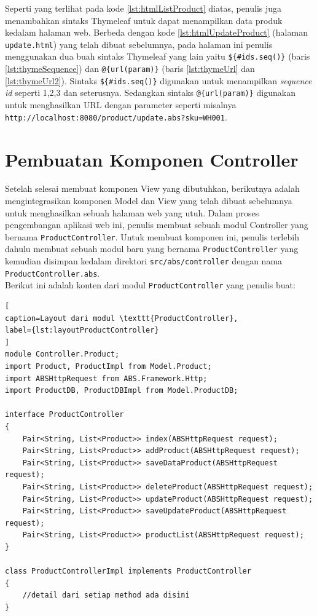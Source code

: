Seperti yang terlihat pada kode \ref{lst:htmlListProduct} diatas, penulis juga menambahkan sintaks Thymeleaf untuk dapat menampilkan data produk kedalam halaman web. Berbeda dengan kode \ref{lst:htmlUpdateProduct} (halaman \texttt{update.html}) yang telah dibuat sebelumnya, pada halaman ini penulis menggunakan dua buah sintaks Thymeleaf yang lain yaitu \texttt{\$\{\#ids.seq()\}} (baris \ref{lst:thymeSequence}) dan \texttt{@\{url(param)\}} (baris \ref{lst:thymeUrl} dan \ref{lst:thymeUrl2}). Sintaks \texttt{\$\{\#ids.seq()\}} digunakan untuk menampilkan \textit{sequence id} seperti 1,2,3 dan seterusnya. Sedangkan sintaks \texttt{@\{url(param)\}} digunakan untuk menghasilkan URL dengan parameter seperti misalnya \texttt{http://localhost:8080/product/update.abs?sku=WH001}.

\section{Pembuatan Komponen Controller}

Setelah selesai membuat komponen View yang dibutuhkan, berikutnya adalah mengintegrasikan komponen Model dan View yang telah dibuat sebelumnya untuk menghasilkan sebuah halaman web yang utuh. Dalam proses pengembangan aplikasi web ini, penulis membuat sebuah modul Controller yang bernama \texttt{ProductController}. Untuk membuat komponen ini, penulis terlebih dahulu membuat sebuah modul baru yang bernama \texttt{ProductController} yang kemudian disimpan kedalam direktori \texttt{src/abs/controller} dengan nama \texttt{ProductController.abs}.\\

Berikut ini adalah konten dari modul \texttt{ProductController} yang penulis buat:

\begin{lstlisting}[
caption=Layout dari modul \texttt{ProductController},
label={lst:layoutProductController}
]
module Controller.Product;
import Product, ProductImpl from Model.Product;
import ABSHttpRequest from ABS.Framework.Http;
import ProductDB, ProductDBImpl from Model.ProductDB;

interface ProductController
{
	Pair<String, List<Product>> index(ABSHttpRequest request);
	Pair<String, List<Product>> addProduct(ABSHttpRequest request);
	Pair<String, List<Product>> saveDataProduct(ABSHttpRequest request);
	Pair<String, List<Product>> deleteProduct(ABSHttpRequest request);
	Pair<String, List<Product>> updateProduct(ABSHttpRequest request);
	Pair<String, List<Product>> saveUpdateProduct(ABSHttpRequest request);
	Pair<String, List<Product>> productList(ABSHttpRequest request);
}

class ProductControllerImpl implements ProductController
{
	//detail dari setiap method ada disini
}
\end{lstlisting}

